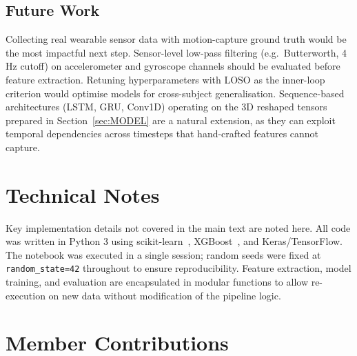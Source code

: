\documentclass[12pt,a4paper]{cibb}
\begin{document}
\subsection{Future Work}
Collecting real wearable sensor data with motion-capture ground truth would be the most impactful next step. Sensor-level low-pass filtering (e.g.\ Butterworth, 4\,Hz cutoff) on accelerometer and gyroscope channels should be evaluated before feature extraction. Retuning hyperparameters with LOSO as the inner-loop criterion would optimise models for cross-subject generalisation. Sequence-based architectures (LSTM, GRU, Conv1D) operating on the 3D reshaped tensors prepared in Section~\ref{sec:MODEL} are a natural extension, as they can exploit temporal dependencies across timesteps that hand-crafted features cannot capture.

\footnotesize


\normalsize

\appendix

\section{Technical Notes}
\label{app:technical}

Key implementation details not covered in the main text are noted here. All code was written in Python 3 using scikit-learn~\cite{scikit-learn}, XGBoost~\cite{chen2016xgboost}, and Keras/TensorFlow. The notebook was executed in a single session; random seeds were fixed at \texttt{random\_state=42} throughout to ensure reproducibility. Feature extraction, model training, and evaluation are encapsulated in modular functions to allow re-execution on new data without modification of the pipeline logic.

\section{Member Contributions}
\label{app:contributions}
\end{document}
